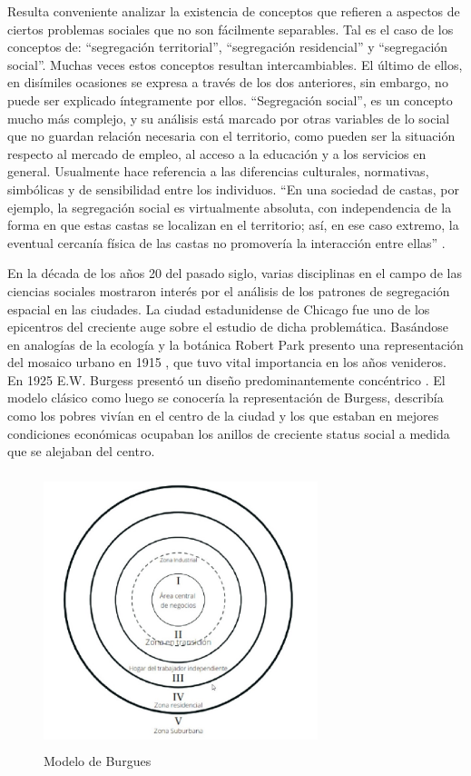 Resulta conveniente analizar la existencia de conceptos que refieren a aspectos de ciertos problemas sociales que no son fácilmente separables. Tal es el caso de los conceptos de: “segregación territorial”, “segregación residencial” y “segregación social”. Muchas veces estos conceptos resultan intercambiables. El último de ellos, en disímiles ocasiones se expresa a través de los dos anteriores, sin embargo, no puede ser explicado íntegramente por ellos. “Segregación social”, es un concepto mucho más complejo, y su análisis está marcado por otras variables de lo social que no guardan relación necesaria con el territorio, como pueden ser la situación respecto al mercado de empleo, al acceso a la educación y a los servicios en general. Usualmente hace referencia a las diferencias culturales, normativas, simbólicas y de sensibilidad entre los individuos. “En una sociedad de castas, por ejemplo, la segregación social es virtualmente absoluta, con independencia de la forma en que estas castas se localizan en el territorio; así, en ese caso extremo, la eventual cercanía física de las castas no promovería la interacción entre ellas” \cite{Merkel2014QueEY}.

En la década de los años 20 del pasado siglo, varias disciplinas en el campo de las ciencias sociales mostraron interés por el análisis de los patrones de segregación espacial en las ciudades. La ciudad estadunidense de Chicago fue uno de los epicentros del creciente auge sobre el estudio de dicha problemática. Basándose en analogías de la ecología y la botánica Robert Park presento una representación del mosaico urbano en 1915 \cite{Goist1971CityA}, que tuvo vital importancia en los años venideros. En 1925 E.W. Burgess  presentó un diseño predominantemente concéntrico \cite{Park1984TheCS}. El modelo clásico como luego se conocería la representación de Burgess, describía como los pobres vivían en el centro de la ciudad y los que estaban en mejores condiciones económicas ocupaban los anillos de creciente status social a medida que se alejaban del centro.

\begin{figure}[h!]
	\centering
	\includegraphics[width=8cm, height=8cm]{Images/Modelo.jpg} 
	\caption{Modelo de Burgues}
\end{figure} 

